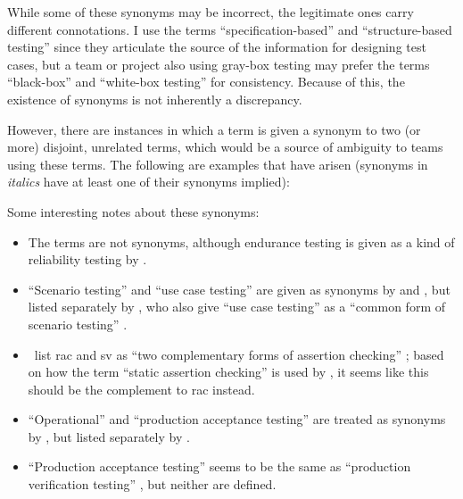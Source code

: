 While some of these synonyms may be incorrect, the legitimate ones carry
different connotations. I use the terms ``specification-based'' and
``structure-based testing'' since they articulate the source of the information
for designing test cases, but a team or project also using gray-box testing may
prefer the terms ``black-box'' and ``white-box testing'' for consistency.
Because of this, the existence of synonyms is not inherently a discrepancy.

However, there are instances in which a term is given a synonym to two (or more)
disjoint, unrelated terms, which would be a source of ambiguity to teams using
these terms. The following are examples that have arisen (synonyms in
\emph{italics} have at least one of their synonyms implied):

\begin{enumerate}
      
\end{enumerate}

Some interesting notes about these synonyms:
\begin{itemize}
      \item The terms are not synonyms, although endurance testing is given
            as a kind of reliability testing by \citet[p.~55]{Firesmith2015}.
      \item ``Scenario testing'' and ``use case testing'' are given as synonyms
            by \citetISTQB{} and \citet[pp.~47-49]{Kam2008}, but listed
            separately by \citet[p.~22]{IEEE2022}, who also give ``use case
            testing'' as a ``common form of scenario testing''
            \citeyearpar[p.~20]{IEEE2021}.
      \item \citeauthor{ChalinEtAl2006}~list \acf{rac} and \acf{sv} as ``two
            complementary forms of assertion checking''
            \citeyearpar[p.~343]{ChalinEtAl2006}; based on how the term ``static
            assertion checking'' is used by \citet[p.~345]{LahiriEtAl2013}, it
            seems like this should be the complement to \acs{rac} instead.
      \item ``Operational'' and ``production acceptance testing'' are treated
            as synonyms by \citetISTQB{}, but listed separately by
            \citet[p.~30]{Firesmith2015}.
      \item ``Production acceptance testing'' \citep[p.~30]{Firesmith2015}
            seems to be the same as ``production verification testing''
            \citep[p.~22]{IEEE2022}, but neither are defined.
\end{itemize}


